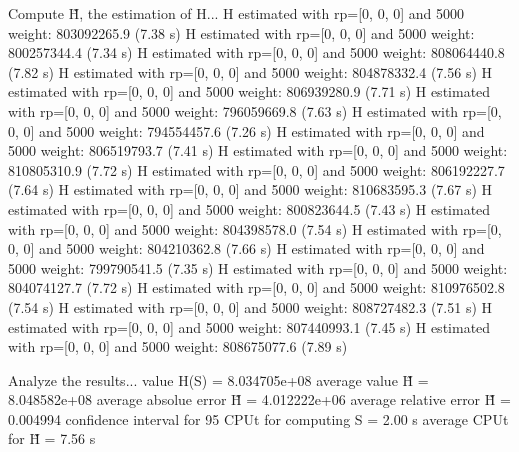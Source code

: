 Compute H̃, the estimation of H...
  H estimated with rp=[0, 0, 0] and 5000 weight:  803092265.9  (7.38 s)
  H estimated with rp=[0, 0, 0] and 5000 weight:  800257344.4  (7.34 s)
  H estimated with rp=[0, 0, 0] and 5000 weight:  808064440.8  (7.82 s)
  H estimated with rp=[0, 0, 0] and 5000 weight:  804878332.4  (7.56 s)
  H estimated with rp=[0, 0, 0] and 5000 weight:  806939280.9  (7.71 s)
  H estimated with rp=[0, 0, 0] and 5000 weight:  796059669.8  (7.63 s)
  H estimated with rp=[0, 0, 0] and 5000 weight:  794554457.6  (7.26 s)
  H estimated with rp=[0, 0, 0] and 5000 weight:  806519793.7  (7.41 s)
  H estimated with rp=[0, 0, 0] and 5000 weight:  810805310.9  (7.72 s)
  H estimated with rp=[0, 0, 0] and 5000 weight:  806192227.7  (7.64 s)
  H estimated with rp=[0, 0, 0] and 5000 weight:  810683595.3  (7.67 s)
  H estimated with rp=[0, 0, 0] and 5000 weight:  800823644.5  (7.43 s)
  H estimated with rp=[0, 0, 0] and 5000 weight:  804398578.0  (7.54 s)
  H estimated with rp=[0, 0, 0] and 5000 weight:  804210362.8  (7.66 s)
  H estimated with rp=[0, 0, 0] and 5000 weight:  799790541.5  (7.35 s)
  H estimated with rp=[0, 0, 0] and 5000 weight:  804074127.7  (7.72 s)
  H estimated with rp=[0, 0, 0] and 5000 weight:  810976502.8  (7.54 s)
  H estimated with rp=[0, 0, 0] and 5000 weight:  808727482.3  (7.51 s)
  H estimated with rp=[0, 0, 0] and 5000 weight:  807440993.1  (7.45 s)
  H estimated with rp=[0, 0, 0] and 5000 weight:  808675077.6  (7.89 s)

Analyze the results...
  value H(S)                  = 8.034705e+08 
  average value H̃             = 8.048582e+08 
  average absolue error H̃     = 4.012222e+06 
  average relative error H̃    = 0.004994 
  confidence interval for 95%
  CPUt for computing S         = 2.00 s
  average CPUt for H̃           = 7.56 s

